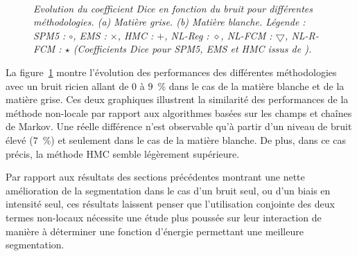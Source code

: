 \begin{figure}[!thbp]

        \begin{center}
	\\
        \end{center}

        \caption{\emph{Evolution du coefficient Dice en fonction du bruit pour différentes méthodologies. (a) Matière grise. (b) Matière blanche. Légende : SPM5 : $\circ$, EMS : $\times$, HMC : $+$, NL-Reg : $\diamond$, NL-FCM : $\bigtriangledown$, NL-R-FCM : $\star$ (Coefficients Dice pour SPM5, EMS et HMC issus de \cite{Bricq:MIA:2008}).}}

        \label{FIG:DICE:BRAINWEB:ALL}

\end{figure}

La figure~\ref{FIG:DICE:BRAINWEB:ALL} montre l'évolution des performances des différentes méthodologies avec un bruit ricien allant de $0$ à $9$~\% dans le cas de la matière blanche et de la matière grise. 
Ces deux graphiques illustrent la similarité des performances de la méthode non-locale par rapport aux algorithmes basées sur les champs et chaînes de Markov.
Une réelle différence n'est observable qu'à partir d'un niveau de bruit élevé ($7$~\%) et seulement dans le cas de la matière blanche. 
De plus, dans ce cas précis, la méthode HMC semble légèrement supérieure.

Par rapport aux résultats des sections précédentes montrant une nette amélioration de la segmentation dans le cas d'un bruit seul, ou d'un biais en intensité seul, ces résultats laissent penser que l'utilisation conjointe des deux termes non-locaux nécessite une étude plus poussée sur leur interaction de manière à déterminer une fonction d'énergie permettant une meilleure segmentation.

